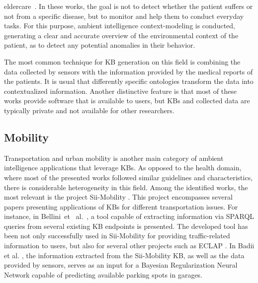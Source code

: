 
 eldercare~\citep{kimandchung, chungetal}. In these works, the goal is not to detect whether the patient suffers or not from a specific disease, but to monitor and help them to conduct everyday tasks. For this purpose, ambient intelligence context-modeling is conducted, generating a clear and accurate overview of the environmental context of the patient, as to detect any potential anomalies in their behavior.

The most common technique for KB generation on this field is combining the data collected by sensors with the information provided by the medical reports of the patients. It is usual that differently specific ontologies transform the data into contextualized information. Another distinctive feature is that most of these works provide software that is available to users, but KBs and collected data are typically private and not available for other researchers. 

\subsection{Mobility}
Transportation and urban mobility is another main category of ambient intelligence applications that leverage KBs. As opposed to the health domain, where most of the presented works followed similar guidelines and characteristics, there is considerable heterogeneity in this field. Among the identified works, the most relevant is the project Sii-Mobility \citep{siimobility-journal}. This project encompasses several papers presenting applications of KBs for different transportation issues. For instance, in Bellini~et~ al.~\citep{siimobility-consult}, a tool capable of extracting information via SPARQL queries from several existing KB endpoints is presented. The developed tool has been not only successfully used in Sii-Mobility for providing traffic-related information to users, but also for several other projects such as ECLAP \citep{eclap}. In Badii et al. \citep{siimobility-parking}, the information extracted from the Sii-Mobility KB, as well as the data provided by sensors, serves as an input for a Bayesian Regularization Neural Network capable of predicting available parking spots in garages. 


